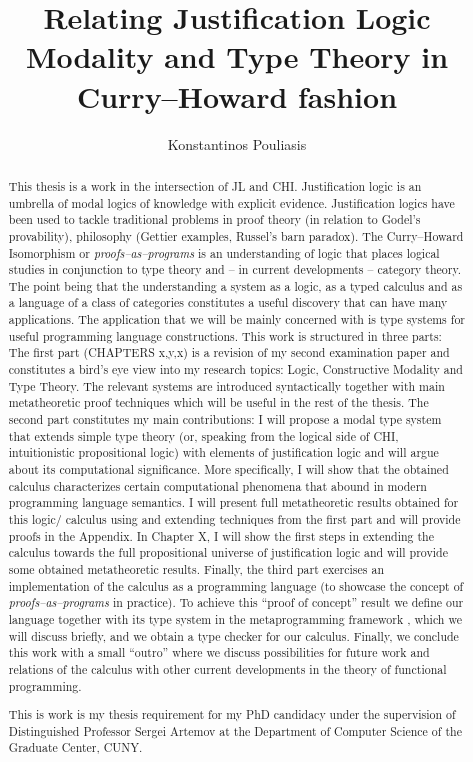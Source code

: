 \documentclass[12pt]{report}
\title{Relating Justification Logic Modality and Type Theory in Curry--Howard fashion}
\author{Konstantinos Pouliasis}
\begin{document}
\maketitle


\begin{abstract}
This thesis is a work in the intersection of \ac{JL} and \ac{CHI}. Justification logic is an umbrella of modal logics of knowledge with explicit evidence. 
Justification logics have been used to tackle traditional problems in proof theory (in relation to Godel's provability), philosophy (Gettier examples, Russel's barn paradox). 
The Curry--Howard Isomorphism or \emph{proofs--as--programs} is an understanding of logic that places logical studies in conjunction to type theory and -- in current developments -- 
category theory. The point being that the  understanding a system as a logic, as a typed calculus and as a language of a class of categories constitutes a useful discovery 
that can have many applications.
The application that we will be mainly concerned with is type systems for useful programming language constructions. 
This work  is structured in three parts: 
The first part (CHAPTERS x,y,x) is a revision of my second examination paper and constitutes a bird's eye view into my research topics:  
Logic, Constructive Modality and Type Theory. 
The relevant systems are introduced syntactically together with main  metatheoretic proof techniques which will be useful 
in the rest of the thesis.
The second part constitutes my main contributions: I will propose  a modal type system that extends simple type theory
 (or, speaking from the logical side of \ac{CHI}, 
intuitionistic propositional logic) with elements of
 justification logic and will argue about its computational significance. 
 More specifically, I will show  
that the obtained calculus characterizes  certain computational phenomena that abound in modern programming language semantics. 
I will present full metatheoretic
results obtained for this logic/ calculus using and extending techniques from the first part and will provide proofs in the Appendix. 
In Chapter X, 
I will show the first steps in extending the calculus towards the full propositional universe of justification logic and
 will provide some obtained metatheoretic results.
Finally, the third part exercises an implementation of the calculus as a programming language (to showcase the concept of \emph{proofs--as--programs} in practice). To achieve this ``proof of concept'' result we define our 
language together with its type system
in the metaprogramming framework , which we will discuss briefly, 
and we obtain a type checker for our calculus. Finally, we conclude this work with a small ``outro'' 
where we discuss possibilities for future work and relations of the calculus with other current developments in the theory 
of functional programming.

This is work is my thesis requirement for my PhD candidacy under the supervision of Distinguished Professor Sergei Artemov at the Department of 
Computer Science of the Graduate Center, CUNY.
\end{abstract}
\end{document}
